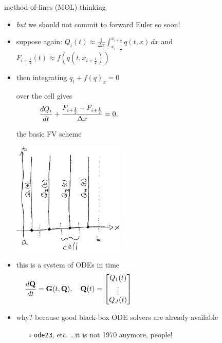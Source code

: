\documentclass[10pt,hyperref,dvipsnames]{beamer}
\newcommand{\bG}{\mathbf{G}}
\newcommand{\bQ}{\mathbf{Q}}
\newcommand{\xiphalf}{{x_{i+\frac{1}{2}}}}
\newcommand{\ximhalf}{{x_{i-\frac{1}{2}}}}
\newcommand{\Fiphalf}{{F_{i+\frac{1}{2}}}}
\newcommand{\ds}{\displaystyle}
\begin{document}
\begin{frame}{method-of-lines (MOL) thinking}

\begin{itemize}
\item \emph{but} we should not commit to forward Euler so soon!
\item suppose again: $\ds Q_i(t) \approx \frac{1}{\Delta x} \int_\ximhalf^\xiphalf q(t,x)\,dx$ and $\Fiphalf(t) \approx f\left(q(t,\xiphalf)\right)$
\item then integrating $q_t + f(q)_x = 0$

over the cell gives
    $$\frac{dQ_i}{dt} + \frac{\Fiphalf-\Fiphalf}{\Delta x} = 0, \hspace{60mm}$$

the basic FV scheme

\vspace{-24mm}
\hfill \includegraphics[width=0.42\textwidth]{figs/molsketch}

\vspace{-21mm}
\item this is a system of ODEs in time
    $$\frac{d\bQ}{dt} = \bG(t,\bQ), \quad \bQ(t) = \begin{bmatrix} Q_1(t) \\ \vdots \\ Q_J(t) \end{bmatrix}   \hspace{60mm}$$

\item why? because good black-box ODE solvers are already available
    \begin{itemize}
    \item[$\circ$] \texttt{ode23}, etc. \qquad \dots it is not 1970 anymore, people!
    \end{itemize}
\end{itemize}
\end{frame}
\end{document}
